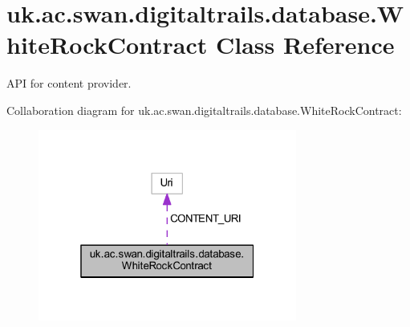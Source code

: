 \hypertarget{classuk_1_1ac_1_1swan_1_1digitaltrails_1_1database_1_1_white_rock_contract}{\section{uk.\+ac.\+swan.\+digitaltrails.\+database.\+White\+Rock\+Contract Class Reference}
\label{classuk_1_1ac_1_1swan_1_1digitaltrails_1_1database_1_1_white_rock_contract}
}


A\+P\+I for content provider.  




Collaboration diagram for uk.\+ac.\+swan.\+digitaltrails.\+database.\+White\+Rock\+Contract\+:\nopagebreak
\begin{figure}[H]
\begin{center}
\leavevmode
\includegraphics[width=241pt]{classuk_1_1ac_1_1swan_1_1digitaltrails_1_1database_1_1_white_rock_contract__coll__graph}
\end{center}
\end{figure}
